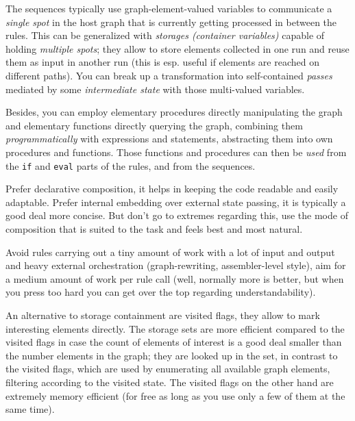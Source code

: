 The sequences typically use graph-element-valued variables to communicate a \emph{single spot} in the host graph that is currently getting processed in between the rules.
This can be generalized with \emph{storages (container variables)} capable of holding \emph{multiple spots}; they allow to store elements collected in one run and reuse them as input in another run (this is esp. useful if elements are reached on different paths).
You can break up a transformation into self-contained \emph{passes} mediated by some \emph{intermediate state} with those multi-valued variables. 

Besides, you can employ elementary procedures directly manipulating the graph and elementary functions directly querying the graph, combining them \emph{programmatically} with expressions and statements, abstracting them into own procedures and functions.
Those functions and procedures can then be \emph{used} from the \texttt{if} and \texttt{eval} parts of the rules, and from the sequences.

\begin{note}
Prefer declarative composition, it helps in keeping the code readable and easily adaptable.
Prefer internal embedding over external state passing, it is typically a good deal more concise.
But don't go to extremes regarding this, use the mode of composition that is suited to the task and feels best and most natural.

Avoid rules carrying out a tiny amount of work with a lot of input and output and heavy external orchestration (graph-rewriting,  assembler-level style), aim for a medium amount of work per rule call (well, normally more is better, but when you press too hard you can get over the top regarding understandability).
\end{note}

\begin{note}
An alternative to storage containment are visited flags, they allow to mark interesting elements directly.
The storage sets are more efficient compared to the visited flags in case the count of elements of interest is a good deal smaller than the number elements in the graph; they are looked up in the set, in contrast to the visited flags, which are used by enumerating all available graph elements, filtering according to the visited state.
The visited flags on the other hand are extremely memory efficient (for free as long as you use only a few of them at the same time).
\end{note}

